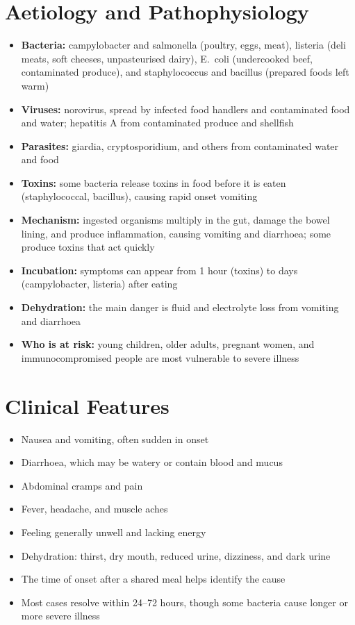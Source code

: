 \section*{Aetiology and Pathophysiology}
\begin{itemize}
    \item \textbf{Bacteria:} campylobacter and salmonella (poultry, eggs, meat), listeria (deli meats, soft cheeses, unpasteurised dairy), E.\ coli (undercooked beef, contaminated produce), and staphylococcus and bacillus (prepared foods left warm)
    \item \textbf{Viruses:} norovirus, spread by infected food handlers and contaminated food and water; hepatitis A from contaminated produce and shellfish
    \item \textbf{Parasites:} giardia, cryptosporidium, and others from contaminated water and food
    \item \textbf{Toxins:} some bacteria release toxins in food before it is eaten (staphylococcal, bacillus), causing rapid onset vomiting
    \item \textbf{Mechanism:} ingested organisms multiply in the gut, damage the bowel lining, and produce inflammation, causing vomiting and diarrhoea; some produce toxins that act quickly
    \item \textbf{Incubation:} symptoms can appear from 1 hour (toxins) to days (campylobacter, listeria) after eating
    \item \textbf{Dehydration:} the main danger is fluid and electrolyte loss from vomiting and diarrhoea
    \item \textbf{Who is at risk:} young children, older adults, pregnant women, and immunocompromised people are most vulnerable to severe illness
\end{itemize}

\section*{Clinical Features}
\begin{itemize}
    \item Nausea and vomiting, often sudden in onset
    \item Diarrhoea, which may be watery or contain blood and mucus
    \item Abdominal cramps and pain
    \item Fever, headache, and muscle aches
    \item Feeling generally unwell and lacking energy
    \item Dehydration: thirst, dry mouth, reduced urine, dizziness, and dark urine
    \item The time of onset after a shared meal helps identify the cause
    \item Most cases resolve within 24--72 hours, though some bacteria cause longer or more severe illness
\end{itemize}


